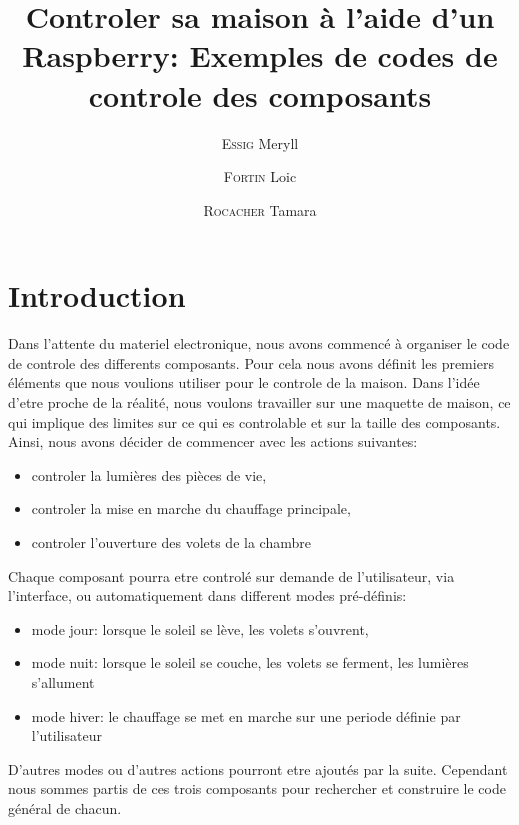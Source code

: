 \documentclass{article}
\title{Controler sa maison à l'aide d'un Raspberry: Exemples de codes de controle des composants}
\author{\textsc{Essig} Meryll \and \textsc{Fortin} Loic \and \textsc{Rocacher} Tamara}
\begin{document}
\maketitle

\vfill
\vfill
\section*{Introduction}
Dans l'attente du materiel electronique, nous avons commencé à organiser le code  de controle des differents composants. Pour cela nous avons définit les premiers éléments que nous voulions utiliser pour le controle de la maison.
Dans l'idée d'etre proche de la réalité, nous voulons travailler sur une maquette de maison, ce qui implique des limites sur ce qui es controlable et sur la taille des composants. Ainsi, nous avons décider de commencer avec les actions suivantes:
\vfill
\begin{itemize}
\item controler la lumières des pièces de vie,
\item controler la mise en marche du chauffage principale,
\item controler l'ouverture des volets de la chambre
\end{itemize}
\vfill
Chaque composant pourra etre controlé sur demande de l'utilisateur, via l'interface, ou automatiquement dans different modes pré-définis:
\vfill
\begin{itemize}
\item mode jour: lorsque le soleil se lève, les volets s'ouvrent,
\item mode nuit: lorsque le soleil se couche, les volets se ferment, les lumières s'allument
\item mode hiver: le chauffage se met en marche sur une periode définie par l'utilisateur
\end{itemize}
\vfill
D'autres modes ou d'autres actions pourront etre ajoutés par la suite. Cependant nous sommes partis de ces trois composants pour rechercher et construire le code général de chacun.
\vfill
\vfill
\end{document}
